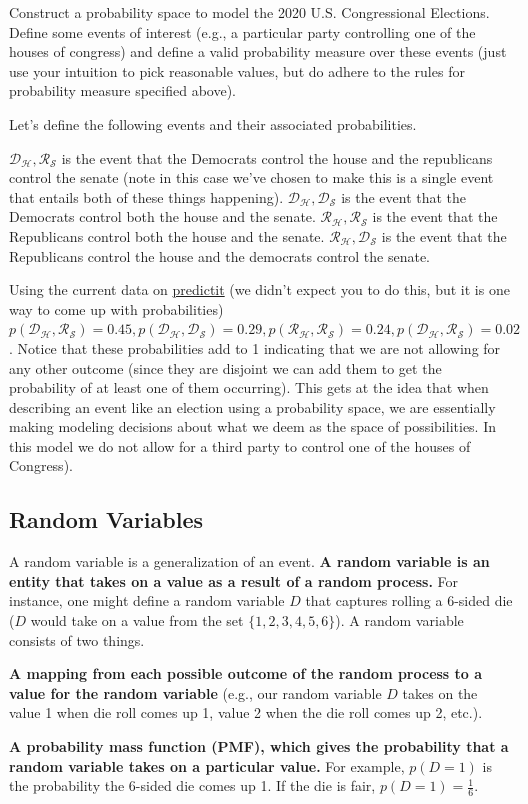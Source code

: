 \documentclass{tufte-handout}
\begin{document}
\begin{exercise}
Construct a probability space to model the 2020 U.S. Congressional Elections.  Define some events of interest (e.g., a particular party controlling one of the houses of congress) and define a valid probability measure over these events (just use your intuition to pick reasonable values, but do adhere to the rules for probability measure specified above).
\begin{boxedsolution}
Let's define the following events and their associated probabilities.
\bi
\item $\mathcal{D_H, R_S}$ is the event that the Democrats control the house and the republicans control the senate (note in this case we've chosen to make this is a single event that entails both of these things happening).  $\mathcal{D_H,D_S}$ is the event that the Democrats control both the house and the senate.  $\mathcal{R_H,R_S}$ is the event that the Republicans control both the house and the senate.  $\mathcal{R_H,D_S}$ is the event that the Republicans control the house and the democrats control the senate.
\item Using the current data on \href{https://www.predictit.org/markets/2/Congress}{predictit} (we didn't expect you to do this, but it is one way to come up with probabilities) $p(\mathcal{D_H, R_S}) = 0.45, p(\mathcal{D_H, D_S}) = 0.29, p(\mathcal{R_H, R_S}) = 0.24, p(\mathcal{D_H, R_S}) = 0.02$.  Notice that these probabilities add to 1 indicating that we are not allowing for any other outcome (since they are disjoint we can add them to get the probability of at least one of them occurring). This gets at the idea that when describing an event like an election using a probability space, we are essentially making modeling decisions about what we deem as the space of possibilities.  In this model we do not allow for a third party to control one of the houses of Congress).
\ei
\end{boxedsolution}
\end{exercise}

\subsection{Random Variables}
A random variable is a generalization of an event.  \textbf{A random variable is an entity that takes on a value as a result of a random process.}  For instance, one might define a random variable $D$ that captures rolling a 6-sided die ($D$ would take on a value from the set $\{1, 2, 3, 4, 5, 6\}$).  A random variable consists of two things.
\bi
\item \textbf{A mapping from each possible outcome of the random process to a value for the random variable} (e.g., our random variable $D$ takes on the value 1 when die roll comes up 1, value 2 when the die roll comes up 2, etc.).
\item \textbf{A probability mass function (PMF), which gives the probability that a random variable takes on a particular value.}  For example, $p(D = 1)$ is the probability the 6-sided die comes up 1.  If the die is fair, $p(D=1)=\frac{1}{6}$.
\end{document}
